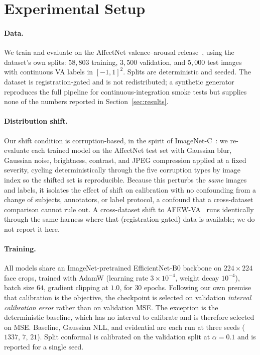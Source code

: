 \section{Experimental Setup}
\label{sec:experiments}

\paragraph{Data.} We train and evaluate on the AffectNet valence--arousal
release~\cite{mollahosseini2017affectnet}, using the dataset's own splits:
$58{,}803$ training, $3{,}500$ validation, and $5{,}000$ test images with
continuous VA labels in $[-1,1]^2$. Splits are deterministic and seeded. The
dataset is registration-gated and is not redistributed; a synthetic generator
reproduces the full pipeline for continuous-integration smoke tests but supplies
none of the numbers reported in Section~\ref{sec:results}.

\paragraph{Distribution shift.} Our shift condition is corruption-based, in the
spirit of ImageNet-C~\cite{hendrycks2019benchmarking}: we re-evaluate each trained
model on the AffectNet test set with Gaussian blur, Gaussian noise, brightness,
contrast, and JPEG compression applied at a fixed severity, cycling
deterministically through the five corruption types by image index so the shifted
set is reproducible. Because this perturbs the \emph{same} images and labels, it
isolates the effect of shift on calibration with no confounding from a change of
subjects, annotators, or label protocol, a confound that a cross-dataset
comparison cannot rule out. A cross-dataset shift to AFEW-VA~\cite{kossaifi2017afew}
runs identically through the same harness where that (registration-gated) data is
available; we do not report it here.

\paragraph{Training.} All models share an ImageNet-pretrained EfficientNet-B0
backbone on $224\times224$ face crops, trained with AdamW (learning rate
$3\times10^{-4}$, weight decay $10^{-4}$), batch size $64$, gradient clipping at
$1.0$, for $30$ epochs. Following our own premise that calibration is the
objective, the checkpoint is selected on validation \emph{interval calibration
error} rather than on validation MSE. The exception is the deterministic
baseline, which has no interval to calibrate and is therefore selected on MSE. Baseline,
Gaussian NLL, and evidential are each run at three seeds ($1337$, $7$, $21$).
Split conformal is calibrated on the validation split at $\alpha = 0.1$ and is
reported for a single seed.

